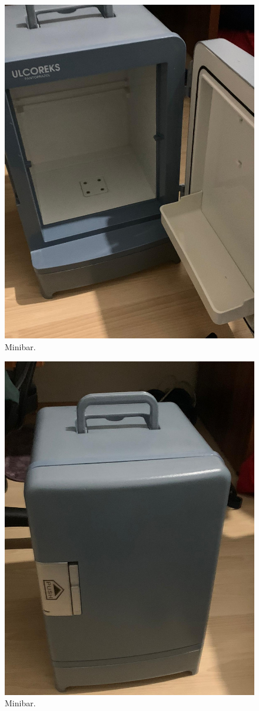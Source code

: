 \begin{figure}[!htbp]
    \centering
    \includegraphics[width=1\textwidth]{Imgs/minibar.jpg}
    \caption{\label{fig:pic1}Minibar.}
\end{figure}

\begin{figure}[!htbp]
    \centering
    \includegraphics[width=1\textwidth]{Imgs/minibar2.jpg}
    \caption{\label{fig:pic1}Minibar.}
\end{figure}

